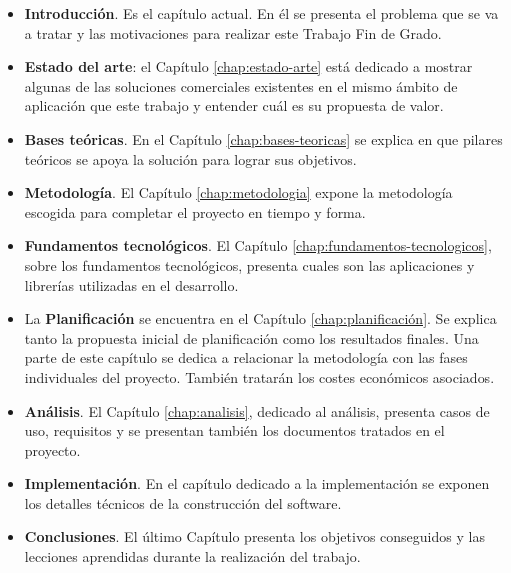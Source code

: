 \begin{itemize}
    \item \textbf{Introducción}. Es el capítulo actual. En él se presenta el problema que se va a tratar y las motivaciones para realizar este Trabajo Fin de Grado.
    \item \textbf{Estado del arte}: el Capítulo \ref{chap:estado-arte} está dedicado a mostrar algunas de las soluciones comerciales existentes en el mismo ámbito de aplicación que este trabajo y entender cuál es su propuesta de valor.
    \item \textbf{Bases teóricas}. En el Capítulo \ref{chap:bases-teoricas} se explica en que pilares teóricos se apoya la solución para lograr sus objetivos.
    \item \textbf{Metodología}. El Capítulo \ref{chap:metodologia} expone la metodología escogida para completar el proyecto en tiempo y forma.
    \item \textbf{Fundamentos tecnológicos}. El Capítulo \ref{chap:fundamentos-tecnologicos}, sobre los fundamentos tecnológicos, presenta cuales son las aplicaciones y librerías utilizadas en el desarrollo.
    \item La \textbf{Planificación} se encuentra en el Capítulo \ref{chap:planificación}. Se explica tanto la propuesta inicial de planificación como los resultados finales. Una parte de este capítulo se dedica a relacionar la metodología con las fases individuales del proyecto. También tratarán los costes económicos asociados.
    \item \textbf{Análisis}. El Capítulo \ref{chap:analisis}, dedicado al análisis, presenta casos de uso, requisitos y se presentan también los documentos tratados en el proyecto.
    \item \textbf{Implementación}. En el capítulo dedicado a la implementación se exponen los detalles técnicos de la construcción del software.
    \item \textbf{Conclusiones}. El último Capítulo presenta los objetivos conseguidos y las lecciones aprendidas durante la realización del trabajo.
\end{itemize}
